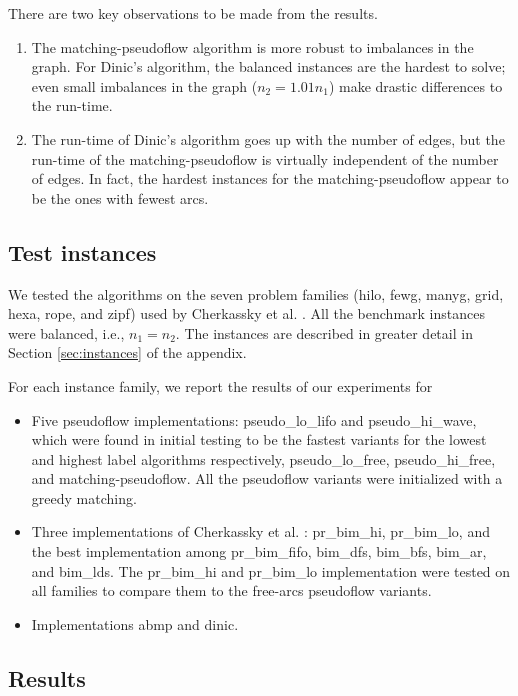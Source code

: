 \documentclass{article}
\begin{document}
There are two key observations to be made from the results.
\begin{enumerate}
\item The {\sf matching-pseudoflow} algorithm is more robust to imbalances in the graph.  For Dinic's algorithm, the balanced instances are the hardest to solve; even small imbalances in the graph ($n_2 = 1.01 n_1$) make drastic differences to the run-time.
\item The run-time of Dinic's algorithm goes up with the number of edges, but the run-time of the {\sf matching-pseudoflow} is virtually independent of the number of edges. In fact, the hardest instances for the {\sf matching-pseudoflow} appear to be the ones with fewest arcs.
\end{enumerate}

\subsection{Test instances}

We tested the algorithms on the seven problem families ({\sf hilo},
{\sf fewg}, {\sf manyg}, {\sf grid}, {\sf hexa}, {\sf rope}, and {\sf
zipf}) used by Cherkassky et al. \cite{CheGMSS98}. All the benchmark
instances were balanced, i.e., $n_1 = n_2$.  The instances are
described in greater detail in Section \ref{sec:instances} of the
appendix.

For each instance family, we report the results of our experiments for
\begin{itemize}
\item Five pseudoflow implementations: {\sf pseudo\_lo\_lifo} and {\sf pseudo\_hi\_wave}, which were found in initial testing to be the fastest variants for the lowest and highest label algorithms respectively, {\sf pseudo\_lo\_free}, {\sf pseudo\_hi\_free}, and {\sf matching-pseudoflow}.  All the pseudoflow variants were initialized with a greedy matching.
\item Three implementations of Cherkassky et al. \cite{CheGMSS98}: {\sf pr\_bim\_hi}, {\sf pr\_bim\_lo}, and the best implementation among {\sf pr\_bim\_fifo}, {\sf bim\_dfs}, {\sf bim\_bfs}, {\sf bim\_ar}, and {\sf bim\_lds}. The {\sf pr\_bim\_hi} and {\sf pr\_bim\_lo} implementation were tested on all families to compare them to the free-arcs pseudoflow variants.
\item Implementations {\sf abmp} and {\sf dinic}.
\end{itemize}

\subsection{Results}
\end{document}
